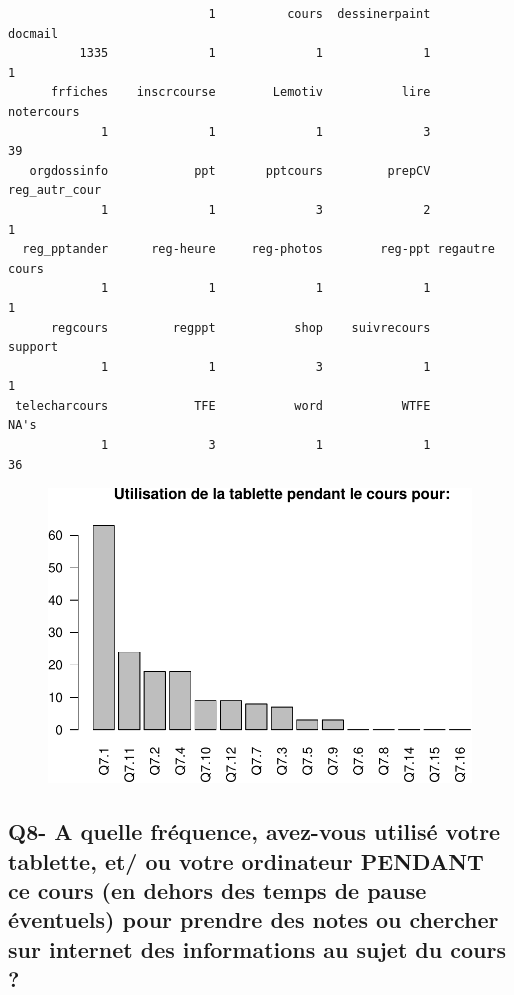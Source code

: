 \documentclass[]{article}
\begin{document}
\begin{verbatim}
                            1          cours  dessinerpaint        docmail 
          1335              1              1              1              1 
      frfiches    inscrcourse        Lemotiv           lire     notercours 
             1              1              1              3             39 
   orgdossinfo            ppt       pptcours         prepCV  reg_autr_cour 
             1              1              3              2              1 
  reg_pptander      reg-heure     reg-photos        reg-ppt regautre cours 
             1              1              1              1              1 
      regcours         regppt           shop    suivrecours        support 
             1              1              3              1              1 
 telecharcours            TFE           word           WTFE           NA's 
             1              3              1              1             36 
\end{verbatim}

\begin{figure}[htbp]
\centering
\includegraphics{qs_etudiants_files/figure-latex/q7-1.pdf}
\end{figure}

\subsection{Q8- A quelle fréquence, avez-vous utilisé votre tablette,
et/ ou votre ordinateur PENDANT ce cours (en dehors des temps de pause
éventuels) pour prendre des notes ou chercher sur internet des
informations au sujet du cours
?}\label{q8--a-quelle-frequence-avez-vous-utilise-votre-tablette-et-ou-votre-ordinateur-pendant-ce-cours-en-dehors-des-temps-de-pause-eventuels-pour-prendre-des-notes-ou-chercher-sur-internet-des-informations-au-sujet-du-cours}
\end{document}
